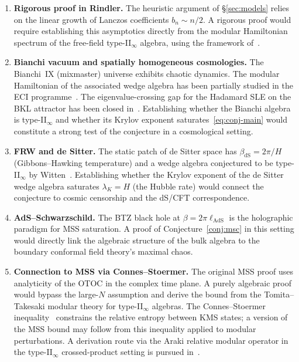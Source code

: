 \documentclass[12pt,a4paper]{article}
\begin{document}
\begin{enumerate}
\item \textbf{Rigorous proof in Rindler.}
  The heuristic argument of \S\ref{sec:models} relies on the linear
  growth of Lanczos coefficients $b_n \sim n/2$.
  A rigorous proof would require establishing this asymptotics directly
  from the modular Hamiltonian spectrum of the free-field type-II$_\infty$
  algebra, using the framework of~\cite{HellerPapalini2024}.

\item \textbf{Bianchi vacuum and spatially homogeneous cosmologies.}
  The Bianchi~IX (mixmaster) universe exhibits chaotic dynamics.
  The modular Hamiltonian of the associated wedge algebra has been
  partially studied in the ECI programme~\cite{ECI_v6}.
  The eigenvalue-crossing gap for the Hadamard SLE on the BKL attractor
  has been closed in~\cite{BIX_lemma_A1}.
  Establishing whether the Bianchi algebra is type-II$_\infty$ and
  whether its Krylov exponent saturates~\eqref{eq:conj-main}
  would constitute a strong test of the conjecture in a cosmological
  setting.

\item \textbf{FRW and de Sitter.}
  The static patch of de Sitter space has $\beta_{\mathrm{dS}} =
  2\pi/H$ (Gibbons--Hawking temperature) and a wedge algebra conjectured
  to be type-II$_\infty$ by Witten~\cite{Witten2022}.
  Establishing whether the Krylov exponent of the de Sitter wedge
  algebra saturates $\lambda_K = H$ (the Hubble rate) would connect
  the conjecture to cosmic censorship and the dS/CFT correspondence.

\item \textbf{AdS--Schwarzschild.}
  The BTZ black hole at $\beta = 2\pi \ell_{\mathrm{AdS}}$ is the
  holographic paradigm for MSS saturation.
  A proof of Conjecture~\ref{conj:msc} in this setting would directly
  link the algebraic structure of the bulk algebra to the boundary
  conformal field theory's maximal chaos.

\item \textbf{Connection to MSS via Connes--Stoermer.}
  The original MSS proof uses analyticity of the OTOC in the complex
  time plane.
  A purely algebraic proof would bypass the large-$N$ assumption and
  derive the bound from the Tomita--Takesaki modular theory for
  type-II$_\infty$ algebras.
  The Connes--Stoermer inequality~\cite{ConnesRovelli1994} constrains
  the relative entropy between KMS states; a version of the MSS bound
  may follow from this inequality applied to modular perturbations.
  A derivation route via the Araki relative modular operator in the
  type-II$_\infty$ crossed-product setting is pursued in~\cite{EREPR_Araki}.
\end{enumerate}
\end{document}
